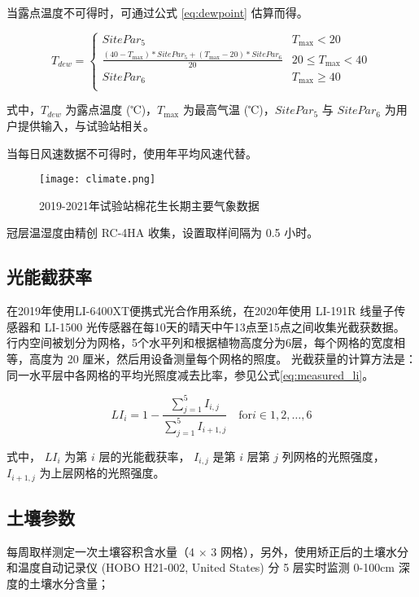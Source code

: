 当露点温度不可得时，可通过公式 \ref{eq:dewpoint} 估算而得。

\begin{equation}\label{eq:dewpoint}
    T_{dew} = \begin{cases}
        SitePar_5                                                            & T_{\max} < 20        \\
        \frac{(40 - T_{\max}) * SitePar_5 + (T_{\max} - 20) * SitePar_6}{20} & 20 \le T_{\max} < 40 \\
        SitePar_6                                                            & T_{\max} \ge 40      \\
    \end{cases}
\end{equation}

式中，$T_{dew}$ 为露点温度 (℃)，$T_{\max}$ 为最高气温 (℃)，$SitePar_5$ 与 $SitePar_6$ 为用户提供输入，与试验站相关。

当每日风速数据不可得时，使用年平均风速代替。

\begin{figure}
    \centering
    \texttt{[image: climate.png]}
    \caption{2019{-}2021年试验站棉花生长期主要气象数据}
\end{figure}

冠层温湿度由精创 RC-4HA 收集，设置取样间隔为 0.5 小时。

\subsection{光能截获率}

在2019年使用LI-6400XT便携式光合作用系统，在2020年使用 LI-191R 线量子传感器和 LI-1500 光传感器在每10天的晴天中午13点至15点之间收集光截获数据。
行内空间被划分为网格，5个水平列和根据植物高度分为6层，每个网格的宽度相等，高度为 20 厘米，然后用设备测量每个网格的照度。
光截获量的计算方法是：同一水平层中各网格的平均光照度减去比率，参见公式\ref{eq:measured_li}。

\begin{equation}\label{eq:measured_li}
    LI_{i} = 1 - \frac{\sum^5_{j=1} I_{i,j}}{\sum^5_{j=1} I_{i+1,j}} \quad \mathrm{for} i \in {1,2,\dots,6}
\end{equation}

式中， $LI_{i}$ 为第 $i$ 层的光能截获率， $I_{i,j}$ 是第 $i$ 层第 $j$ 列网格的光照强度， $I_{i+1,j}$ 为上层网格的光照强度。

\subsection{土壤参数}
每周取样测定一次土壤容积含水量（4 $\times$ 3 网格），另外，使用矫正后的土壤水分和温度自动记录仪 (HOBO H21-002, United States) 分 5 层实时监测 0-100cm 深度的土壤水分含量；

